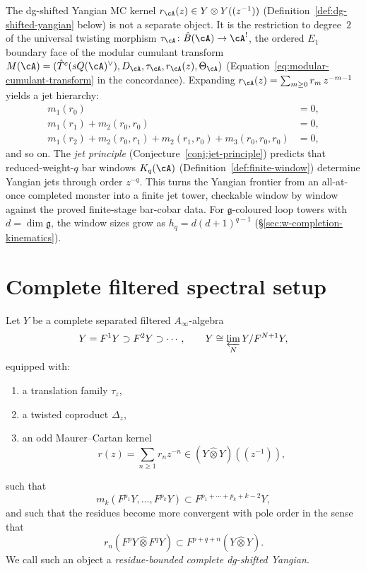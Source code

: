 \begin{remark}
\label{rem:yangian-ordered-boundary-face}
The dg-shifted Yangian MC kernel $r_\cA(z) \in Y \otimes Y((z^{-1}))$
(Definition~\ref{def:dg-shifted-yangian} below) is not a
separate object. It is the restriction to degree~$2$ of the
universal twisting morphism
$\tau_\cA\colon \hat{B}(\cA) \to \cA^!$, the ordered $E_1$
boundary face of the modular cumulant transform
$M(\cA) = (\hat{T}^c(sQ(\cA)^\vee), D_\cA, \tau_\cA,
r_\cA(z), \Theta_\cA)$
(Equation~\eqref{eq:modular-cumulant-transform} in the
concordance). Expanding $r_\cA(z) = \sum_{m \geq 0}
r_m\, z^{-m-1}$ yields a jet hierarchy:
\begin{align*}
m_1(r_0) &= 0, \\
m_1(r_1) + m_2(r_0, r_0) &= 0, \\
m_1(r_2) + m_2(r_0, r_1) + m_2(r_1, r_0) + m_3(r_0, r_0, r_0) &= 0,
\end{align*}
and so on. The \emph{jet principle}
(Conjecture~\ref{conj:jet-principle}) predicts that
reduced-weight-$q$ bar windows $K_q(\cA)$
(Definition~\ref{def:finite-window}) determine Yangian jets
through order $z^{-q}$. This turns the Yangian frontier from an
all-at-once completed monster into a finite jet tower, checkable
window by window against the proved finite-stage bar-cobar data.
For $\mathfrak{g}$-coloured loop towers with $d = \dim\mathfrak{g}$,
the window sizes grow as $h_q = d(d+1)^{q-1}$
(\S\ref{sec:w-completion-kinematics}).
\end{remark}

\section{Complete filtered spectral setup}

\begin{definition}
Let $Y$ be a complete separated filtered $A_\infty$-algebra
\[
Y=F^1Y\supset F^2Y\supset \cdots,
\qquad
Y\cong \varprojlim_N Y/F^{N+1}Y,
\]
equipped with:
\begin{enumerate}
\item a translation family $\tau_z$,
\item a twisted coproduct $\Delta_z$,
\item an odd Maurer--Cartan kernel
\[
r(z)=\sum_{n\ge 1} r_n z^{-n} \in (Y\widehat\otimes Y)((z^{-1})),
\]
\end{enumerate}
such that
\[
m_k(F^{p_1}Y,\dots,F^{p_k}Y)
\subset F^{p_1+\cdots+p_k+k-2}Y,
\]
and such that the residues become more convergent with pole order in the
sense that
\[
r_n(F^pY\widehat\otimes F^qY)
\subset F^{p+q+n}(Y\widehat\otimes Y).
\]
We call such an object a \emph{residue-bounded complete dg-shifted
Yangian}.
\end{definition}

